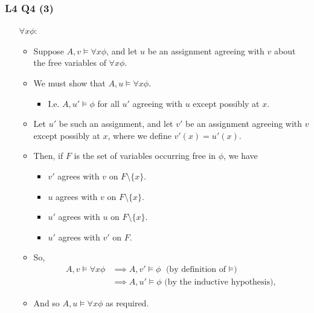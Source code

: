 \documentclass[handout]{beamer}
\begin{document}
\begin{frame}
\frametitle{L4 Q4 (3)}
\begin{itemize}
\item[$\forall x \phi$:]\begin{itemize} 
\item Suppose $A ,v\models \forall x \phi$, and let $u$ be an assignment agreeing with $v$ about the free variables of $\forall x\phi$. 
\item We must show that $A, u\models \forall x \phi$. 
\begin{itemize}
\item I.e. $A, u'\models \phi$ for all $u'$ agreeing with $u$ except possibly at $x$. 
\end{itemize}
\item Let $u'$ be such an assignment, and let $v'$ be an assignment agreeing with $v$ except possibly at $x$, where we define $v'(x)=u'(x)$. 
\item Then, if $F$ is the set of variables occurring free in $\phi$, we have
\begin{itemize}
\item $v'$ agrees with $v$ on $F\setminus\{x\}$.
\item $u$ agrees with $v$ on $F\setminus\{x\}$.
\item $u'$ agrees with $u$ on $F\setminus\{x\}$.
\item $u'$ agrees with $v'$ on $F$.
\end{itemize}
\item So,
\begin{align*}
A,v\models \forall x \phi &\implies A, v'\models \phi \text{ (by definition of $\models$)}  \\
&\implies A,u'\models \phi \text{ (by the inductive hypothesis)},
\end{align*}
\item And so $A,u\models \forall x\phi$ as required.
\end{itemize}
\end{itemize}
\end{frame}
\end{document}
